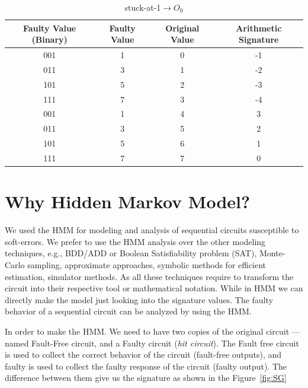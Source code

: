 \begin{table}[tb!]
\center
\caption{stuck-at-1$\rightarrow O_0$}

\label{s@1-O0}

\begin{tabular}{|c | c| c | c| } 
 \hline
 \rowcolor{lightgray}
Faulty Value (Binary) & Faulty Value & Original Value & Arithmetic Signature   \\ 
\hline

 
 
 001& 1 &0 & -1  \\
 \hline
 011 & 3 & 1 & -2 \\ 
 \hline
 
 101 & 5 & 2 & -3 \\
 \hline
 111& 7& 3& -4 \\
 \hline
 001 & 1  &  4& 3 \\
 \hline
 011 & 3 & 5 &2  \\
 \hline
 101 & 5 & 6 & 1 \\
 \hline
 111 & 7 & 7 & 0 \\
 \hline
 
 
\end{tabular}
\end{table}




\section{Why Hidden Markov Model?}


We used the HMM for modeling and analysis of sequential circuits susceptible to soft-errors. We prefer to use the HMM analysis over the other modeling techniques, e.g., BDD/ADD or Boolean Satisfiability problem (SAT), Monte-Carlo sampling, approximate approaches, symbolic methods for efficient estimation, simulator methods. As all these techniques require to transform the circuit into their respective tool or mathematical notation. While in HMM we can directly make the model just looking into the signature values. The faulty behavior of a sequential circuit can be analyzed by using the HMM.  

In order to make the HMM. We need to have two copies of the original circuit --- named Fault-Free circuit, and a Faulty circuit (\textit{hit circuit}). The Fault free circuit is used to collect the correct behavior of the circuit (fault-free outputs), and faulty is used to collect the faulty response of the circuit (faulty output). The difference between them give us the signature as shown in the Figure~\ref{fig:SG}


